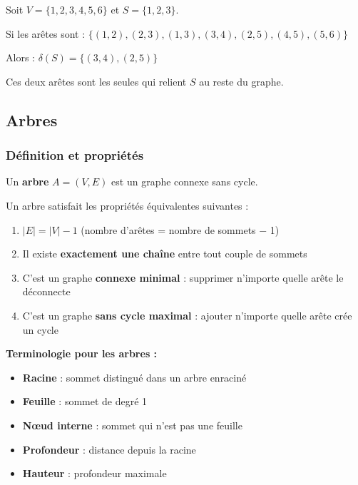 \documentclass[12pt,a4paper]{article}
\begin{document}
\begin{exemple}
Soit $V = \{1, 2, 3, 4, 5, 6\}$ et $S = \{1, 2, 3\}$.

Si les arêtes sont : $\{(1,2), (2,3), (1,3), (3,4), (2,5), (4,5), (5,6)\}$

Alors : $\delta(S) = \{(3,4), (2,5)\}$

Ces deux arêtes sont les seules qui relient $S$ au reste du graphe.
\end{exemple}

\newpage
\subsection{Arbres}

\subsubsection{Définition et propriétés}

\begin{definition}
Un \textcolor{titrebleu}{\textbf{arbre}} $A = (V, E)$ est un graphe connexe sans cycle.
\end{definition}

\begin{important}
Un arbre satisfait les propriétés équivalentes suivantes :
\begin{enumerate}
    \item $|E| = |V| - 1$ (nombre d'arêtes = nombre de sommets $-$ 1)
    \item Il existe \textcolor{titrebleu}{\textbf{exactement une chaîne}} entre tout couple de sommets
    \item C'est un graphe \textcolor{defvert}{\textbf{connexe minimal}} : supprimer n'importe quelle arête le déconnecte
    \item C'est un graphe \textcolor{algoviolet}{\textbf{sans cycle maximal}} : ajouter n'importe quelle arête crée un cycle
\end{enumerate}
\end{important}

\begin{notecours}
\textbf{Terminologie pour les arbres :}
\begin{itemize}
    \item \textbf{Racine} : sommet distingué dans un arbre enraciné
    \item \textbf{Feuille} : sommet de degré 1
    \item \textbf{Nœud interne} : sommet qui n'est pas une feuille
    \item \textbf{Profondeur} : distance depuis la racine
    \item \textbf{Hauteur} : profondeur maximale
\end{itemize}
\end{notecours}
\end{document}
